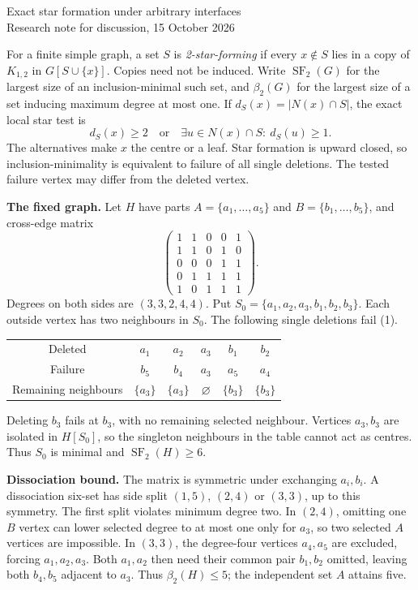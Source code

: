 \documentclass[11pt]{article}
\newcommand{\SF}{\operatorname{SF}_2}
\newcommand{\bb}{\beta_2}
\begin{document}
\begin{center}
{\Large Exact star formation under arbitrary interfaces}\\[4pt]
Research note for discussion, 15 October 2026
\end{center}

For a finite simple graph, a set $S$ is \emph{2-star-forming} if every
$x\notin S$ lies in a copy of $K_{1,2}$ in $G[S\cup\{x\}]$. Copies need not
be induced. Write $\SF(G)$ for the largest size of an inclusion-minimal such
set, and $\bb(G)$ for the largest size of a set inducing maximum degree at
most one. If $d_S(x)=|N(x)\cap S|$, the exact local star test is
\[
 d_S(x)\ge2\quad\text{or}\quad
 \exists u\in N(x)\cap S:\ d_S(u)\ge1. \tag{1}
\]
The alternatives make $x$ the centre or a leaf. Star formation is upward
closed, so inclusion-minimality is equivalent to failure of all single
deletions. The tested failure vertex may differ from the deleted vertex.

\textbf{The fixed graph.} Let $H$ have parts $A=\{a_1,\ldots,a_5\}$ and
$B=\{b_1,\ldots,b_5\}$, and cross-edge matrix
\[
\begin{pmatrix}
1&1&0&0&1\\1&1&0&1&0\\0&0&0&1&1\\0&1&1&1&1\\1&0&1&1&1
\end{pmatrix}.
\]
Degrees on both sides are $(3,3,2,4,4)$. Put
$S_0=\{a_1,a_2,a_3,b_1,b_2,b_3\}$. Each outside vertex has two neighbours
in $S_0$. The following single deletions fail (1).
\begin{center}
\begin{tabular}{@{}cccccc@{}}
\toprule
Deleted & $a_1$ & $a_2$ & $a_3$ & $b_1$ & $b_2$ \\
Failure & $b_5$ & $b_4$ & $a_3$ & $a_5$ & $a_4$ \\
Remaining neighbours & $\{a_3\}$ & $\{a_3\}$ & $\varnothing$ & $\{b_3\}$ & $\{b_3\}$ \\
\bottomrule
\end{tabular}
\end{center}
Deleting $b_3$ fails at $b_3$, with no remaining selected neighbour.
Vertices $a_3,b_3$ are isolated in $H[S_0]$, so the singleton neighbours
in the table cannot act as centres. Thus $S_0$ is minimal and $\SF(H)\ge6$.

\textbf{Dissociation bound.} The matrix is symmetric under exchanging
$a_i,b_i$. A dissociation six-set has side split $(1,5)$, $(2,4)$ or $(3,3)$,
up to this symmetry. The first split violates minimum degree two. In
$(2,4)$, omitting one $B$ vertex can lower selected degree to at most one
only for $a_3$, so two selected $A$ vertices are impossible. In $(3,3)$,
the degree-four vertices $a_4,a_5$ are excluded, forcing $a_1,a_2,a_3$.
Both $a_1,a_2$ then need their common pair $b_1,b_2$ omitted, leaving both
$b_4,b_5$ adjacent to $a_3$. Thus $\bb(H)\le5$; the independent set $A$
attains five.
\end{document}
